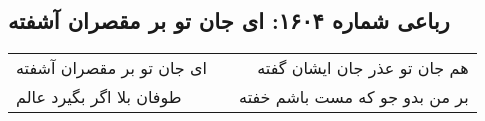 \begin{center}
\section*{رباعی شماره ۱۶۰۴: ای جان تو بر مقصران آشفته}
\label{sec:1604}
\begin{longtable}{l p{0.5cm} r}
ای جان تو بر مقصران آشفته
&&
هم جان تو عذر جان ایشان گفته
\\
طوفان بلا اگر بگیرد عالم
&&
بر من بدو جو که مست باشم خفته
\\
\end{longtable}
\end{center}
